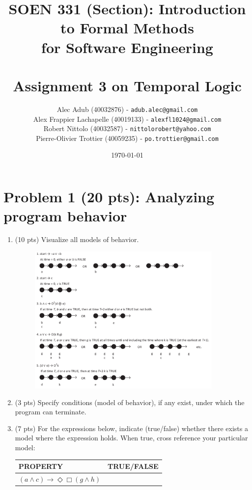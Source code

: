 \documentclass[12pt]{article}
\title{SOEN 331 (Section): Introduction to Formal Methods\\for Software Engineering\\
\ \\
Assignment 3 on Temporal Logic}
\author{\begin{tabular}{c}
Alec Adub (40032876) - \texttt{adub.alec@gmail.com} \tabularnewline
Alex Frappier Lachapelle (40019133) - \texttt{alexfl1024@gmail.com} \tabularnewline
Robert Nittolo (40032587) - \texttt{nittolorobert@yahoo.com} \tabularnewline
Pierre-Olivier Trottier (40059235) - \texttt{po.trottier@gmail.com} \tabularnewline\\
\end{tabular}
}
\date{\today}
\begin{document}
\maketitle

\newpage

\section*{Problem 1 (20 pts):  Analyzing program behavior}

\begin{enumerate}

\item (10 pts) Visualize all models of behavior.

\begin{figure}[h!]
  \centering
  \includegraphics[width=0.9\textwidth]{q1.pdf}
\end{figure}

\item (3 pts) Specify conditions (model of behavior), if any exist, under which the program can terminate.

\item (7 pts) For the expressions below, indicate (true/false) whether there exists a 
model where the expression holds. When true, cross reference your particular model:

\begin{table}
\centering
\begin{tabular}{|l|l|}
\hline
\textbf{PROPERTY}							& \textbf{TRUE/FALSE}\\
\hline

$(a \wedge c) \rightarrow \Diamond \Box (g \wedge h)$	 &\\


\end{tabular}
\end{table}
\end{enumerate}
\end{document}
